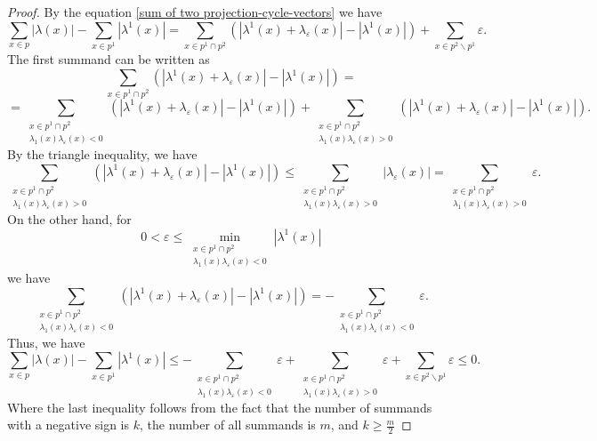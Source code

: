 \documentclass[12p]{article}
\numberwithin{equation}{section}
\begin{document}
\begin{proof}
    By the equation \eqref{sum of two projection-cycle-vectors} we have
    \begin{equation*}
    \sum_{x \in p}|\lambda(x)|-\sum_{x \in p^1}|\lambda^1(x)|=\sum_{x \in p^1 \cap p^2}\left(|\lambda^1(x)+\lambda_\varepsilon(x)|-|\lambda^1(x)|\right)+\sum_{x \in p^2\backslash p^1}\varepsilon.
    \end{equation*}
    The first summand can be written as
    \[
    \sum_{x \in p^1 \cap p^2}\left(|\lambda^1(x)+\lambda_\varepsilon(x)|-|\lambda^1(x)|\right)=
    \]
    \[
    =\sum_{\substack{x \in p^1 \cap p^2 \\ \lambda_1(x)\lambda_\varepsilon(x)<0}}\left(|\lambda^1(x)+\lambda_\varepsilon(x)|-|\lambda^1(x)|\right)+\sum_{\substack{x \in p^1 \cap p^2 \\ \lambda_1(x)\lambda_\varepsilon(x)>0}}\left(|\lambda^1(x)+\lambda_\varepsilon(x)|-|\lambda^1(x)|\right).
    \]
    By the triangle inequality, we have 
    \[
    \sum_{\substack{x \in p^1 \cap p^2 \\ \lambda_1(x)\lambda_\varepsilon(x)>0}}\left(|\lambda^1(x)+\lambda_\varepsilon(x)|-|\lambda^1(x)|\right) \le \sum_{\substack{x \in p^1 \cap p^2 \\ \lambda_1(x)\lambda_\varepsilon(x)>0}}|\lambda_\varepsilon(x)|=\sum_{\substack{x \in p^1 \cap p^2 \\ \lambda_1(x)\lambda_\varepsilon(x)>0}}\varepsilon.
    \]
    On the other hand, for  \[ 0 < \varepsilon \le \min_{\substack{x \in p^1 \cap p^2 \\ \lambda_1(x)\lambda_\varepsilon(x)<0}}|\lambda^1(x)|\] we have
    \[
    \sum_{\substack{x \in p^1 \cap p^2 \\ \lambda_1(x)\lambda_\varepsilon(x)<0}}\left(|\lambda^1(x)+\lambda_\varepsilon(x)|-|\lambda^1(x)|\right)=-\sum_{\substack{x \in p^1 \cap p^2 \\ \lambda_1(x)\lambda_\varepsilon(x)<0}} \varepsilon.
    \]
    Thus, we have
    \[
    \sum_{x \in p}|\lambda(x)|-\sum_{x \in p^1}|\lambda^1(x)| \le -\sum_{\substack{x \in p^1 \cap p^2 \\ \lambda_1(x)\lambda_\varepsilon(x)<0}} \varepsilon + \sum_{\substack{x \in p^1 \cap p^2 \\ \lambda_1(x)\lambda_\varepsilon(x)>0}}\varepsilon + \sum_{x \in p^2\backslash p^1}\varepsilon \le 0.
    \]
    Where the last inequality follows from the fact that the number of summands with a negative sign is \(k\), the number of all summands is \(m\), and \(k \ge \frac{m}{2}\)
\end{proof}
\end{document}
